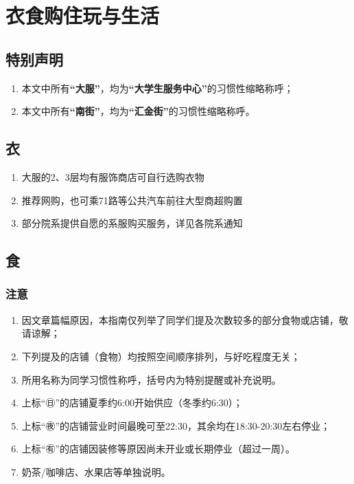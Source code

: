 \chapter[衣食购住玩与生活]{衣食购住玩与生活}

\section*{特别声明}
\begin{enumerate}
    \item 本文中所有\textbf{“大服”}，均为\textbf{“大学生服务中心”}的习惯性缩略称呼；
    \item 本文中所有\textbf{“南街”}，均为\textbf{“汇金街”}的习惯性缩略称呼。
\end{enumerate}
\section[衣]{衣}
\begin{enumerate}
    \item 大服的2、3层均有服饰商店可自行选购衣物
    \item 推荐网购，也可乘71路等公共汽车前往大型商超购置
    \item 部分院系提供自愿的系服购买服务，详见各院系通知
\end{enumerate}

\section[食]{食}
\subsection*{注意}
\begin{enumerate}
    \item 因文章篇幅原因，本指南仅列举了同学们提及次数较多的部分食物或店铺，敬请谅解；
    \item 下列提及的店铺（食物）均按照空间顺序排列，与好吃程度无关；
    \item 所用名称为同学习惯性称呼，括号内为特别提醒或补充说明。
    \item 上标“㊐”的店铺夏季约6:00开始供应（冬季约6:30）；
    \item 上标“㊰”的店铺营业时间最晚可至22:30，其余均在18:30-20:30左右停业；
    \item 上标“㊒”的店铺因装修等原因尚未开业或长期停业（超过一周）。
    \item 奶茶/咖啡店、水果店等单独说明。
\end{enumerate}

